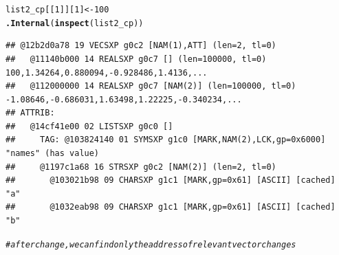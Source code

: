 \documentclass{article}\usepackage[]{graphicx}\usepackage[]{color}
\makeatletter
\newcommand{\hlnum}[1]{\textcolor[rgb]{0.686,0.059,0.569}{#1}}%
\newcommand{\hlcom}[1]{\textcolor[rgb]{0.678,0.584,0.686}{\textit{#1}}}%
\newcommand{\hlstd}[1]{\textcolor[rgb]{0.345,0.345,0.345}{#1}}%
\newcommand{\hlkwb}[1]{\textcolor[rgb]{0.69,0.353,0.396}{#1}}%
\newcommand{\hlkwd}[1]{\textcolor[rgb]{0.737,0.353,0.396}{\textbf{#1}}}%
\newenvironment{kframe}{%
 \def\at@end@of@kframe{}%
 \ifinner\ifhmode%
  \def\at@end@of@kframe{\end{minipage}}%
  \begin{minipage}{\columnwidth}%
 \fi\fi%
 \def\FrameCommand##1{\hskip\@totalleftmargin \hskip-\fboxsep
 \colorbox{shadecolor}{##1}\hskip-\fboxsep
     \hskip-\linewidth \hskip-\@totalleftmargin \hskip\columnwidth}%
 \MakeFramed {\advance\hsize-\width
   \@totalleftmargin\z@ \linewidth\hsize
   \@setminipage}}%
 {\par\unskip\endMakeFramed%
 \at@end@of@kframe}
\newenvironment{knitrout}{}{} %
\makeatother
\begin{document}
\begin{knitrout}
\begin{kframe}
\begin{alltt}
\hlstd{list2_cp[[}\hlnum{1}\hlstd{]][}\hlnum{1}\hlstd{]}\hlkwb{<-}\hlnum{100}
\hlkwd{.Internal}\hlstd{(}\hlkwd{inspect}\hlstd{(list2_cp))}
\end{alltt}
\begin{verbatim}
## @12b2d0a78 19 VECSXP g0c2 [NAM(1),ATT] (len=2, tl=0)
##   @11140b000 14 REALSXP g0c7 [] (len=100000, tl=0) 100,1.34264,0.880094,-0.928486,1.4136,...
##   @112000000 14 REALSXP g0c7 [NAM(2)] (len=100000, tl=0) -1.08646,-0.686031,1.63498,1.22225,-0.340234,...
## ATTRIB:
##   @14cf41e00 02 LISTSXP g0c0 [] 
##     TAG: @103824140 01 SYMSXP g1c0 [MARK,NAM(2),LCK,gp=0x6000] "names" (has value)
##     @1197c1a68 16 STRSXP g0c2 [NAM(2)] (len=2, tl=0)
##       @103021b98 09 CHARSXP g1c1 [MARK,gp=0x61] [ASCII] [cached] "a"
##       @1032eab98 09 CHARSXP g1c1 [MARK,gp=0x61] [ASCII] [cached] "b"
\end{verbatim}
\begin{alltt}
\hlcom{#after change, we can find only the address of relevant vector changes}
\end{alltt}
\end{kframe}
\end{knitrout}
\end{document}
